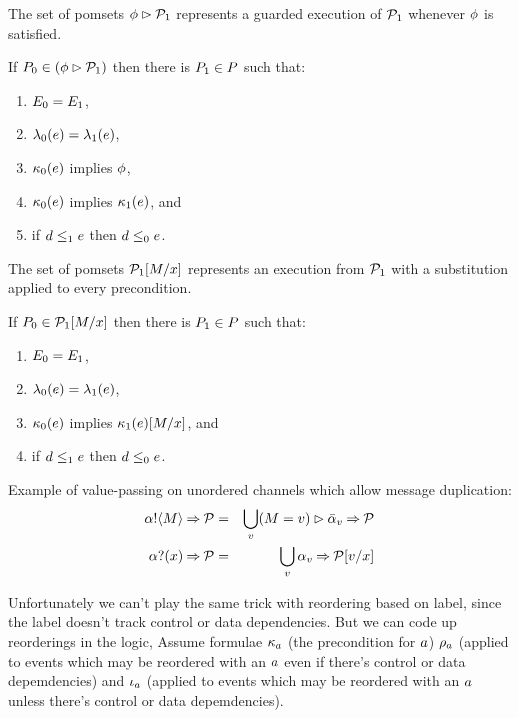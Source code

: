 The set of pomsets $\phi\mathbin\rhd\mathcal{P}_1$ represents a guarded execution of $\mathcal{P}_1$ whenever $\phi$ is satisfied.
\begin{definition}
  \label{defn:pomset-guard}
  If $P_0 \in (\phi\mathbin\rhd\mathcal{P}_1)$ then there is $P_1\in P$ such that:
  \begin{enumerate}
  \item $E_0 = E_1$,
  \item $\lambda_0(e) = \lambda_1(e)$,
  \item $\kappa_0(e)$ implies $\phi$,
  \item $\kappa_0(e)$ implies $\kappa_1(e)$, and
  \item if $d\le_1e$ then $d\le_0e$.
    \setcounter{pomsetGuardCount}{\value{enumi}}
  \end{enumerate}
\end{definition}

The set of pomsets $\mathcal{P}_1[M/x]$ represents an execution from $\mathcal{P}_1$ with a substitution
applied to every precondition.
\begin{definition}
  \label{defn:pomset-subst}
  If $P_0 \in \mathcal{P}_1[M/x]$ then there is $P_1\in P$ such that:
  \begin{enumerate}
  \item $E_0 = E_1$,
  \item $\lambda_0(e) = \lambda_1(e)$,
  \item $\kappa_0(e)$ implies $\kappa_1(e)[M/x]$, and
  \item if $d\le_1e$ then $d\le_0e$.
  \end{enumerate}
\end{definition}

Example of value-passing on unordered channels which allow
message duplication:
\begin{eqnarray*}
  \sSEND\aChan\aExp\sPREFIX\aPSS & = &
  \bigcup_\aVal (\aExp=\aVal) \sGUARD \send\aChan{\aVal} \sPREFIX \aPSS
\\
  \sRECV\aChan\aVar\sPREFIX\aPSS & = &
  \bigcup_\aVal \recv\aChan{\aVal} \sPREFIX \aPSS[\aVal/\aVar]
\end{eqnarray*}

Unfortunately we can't play the same trick with reordering based on
label, since the label doesn't track control or data dependencies. But
we can code up reorderings in the logic, Assume formulae
$\kappa_a$ (the precondition for $a$)
$\rho_a$ (applied to events which may be reordered with
an $a$ even if there's control or data depemdencies) and
$\iota_a$ (applied to events which may be reordered with
an $a$ unless there's control or data depemdencies).

